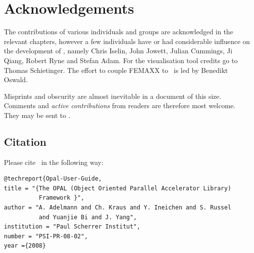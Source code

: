 \section{Acknowledgements}
The contributions of various individuals and groups are acknowledged in the relevant chapters, however a few individuals have or had considerable influence on the 
development of \opal, namely Chris Iselin, John Jowett, Julian Cummings, Ji Qiang, Robert Ryne and Stefan Adam. For the \partroot visualisation tool credits go to Thomas Schietinger.
The effort to couple FEMAXX to \opal\ is led by Benedikt Oswald. 

Misprints and obscurity are almost inevitable in a document of this size.
Comments and {\em active contributions}  from readers are therefore most welcome.
They may be sent to .


\subsection{Citation}
Please cite \opal\ in the following way:
\begin{footnotesize}
\begin{verbatim} 
@techreport{Opal-User-Guide,
title = "{The OPAL (Object Oriented Parallel Accelerator Library) 
          Framework }",
author = "A. Adelmann and Ch. Kraus and Y. Ineichen and S. Russel 
          and Yuanjie Bi and J. Yang",          
institution = "Paul Scherrer Institut",
number = "PSI-PR-08-02",
year ={2008}
\end{verbatim}
\end{footnotesize}




